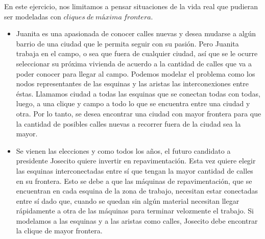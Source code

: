 En este ejercicio, nos limitamos a pensar situaciones de la vida real que pudieran ser modeladas con $cliques\ de\ máxima\ frontera$.
\begin{itemize}
\item Juanita es una apasionada de conocer calles nuevas y desea mudarse a algún barrio de una ciudad que le permita seguir con su pasión. Pero Juanita trabaja en el campo, o sea que fuera de cualquier ciudad, así que se le ocurre seleccionar su próxima vivienda de acuerdo a la cantidad de calles que va a poder conocer para llegar al campo. Podemos modelar el problema como los nodos representantes de las esquinas y las aristas las interconexiones entre éstas. Llamamos ciudad a todas las esquinas que se conectan todas con todas, luego, a una clique y campo a todo lo que se encuentra entre una ciudad y otra. Por lo tanto, se desea encontrar una ciudad con mayor frontera para que la cantidad de posibles calles nuevas a recorrer fuera de la ciudad sea la mayor.

\item Se vienen las elecciones y como todos los años, el futuro candidato a presidente Josecito quiere invertir en repavimentación. Esta vez quiere elegir las esquinas interconectadas entre sí que tengan la mayor cantidad de calles en su frontera. Esto se debe a que las máquinas de repavimentación, que se encuentran en cada esquina de la zona de trabajo, necesitan estar conectadas entre sí dado que, cuando se quedan sin algún material necesitan llegar rápidamente a otra de las máquinas para terminar velozmente el trabajo. Si modelamos a las esquinas y a las aristas como calles, Josecito debe encontrar la clique de mayor frontera. 
\end{itemize}
